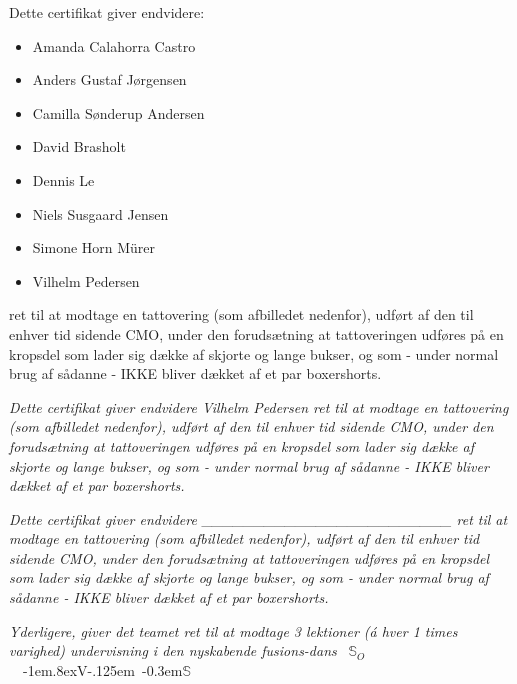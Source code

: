 \documentclass[danish]{article}
\makeatletter
\DeclareRobustCommand{\sovs}{
 \mbox{
  {\Large $\mathbb{S}_{O}$  }
  {\kern-1em\raise.8ex\hbox{V}\kern-.125em\@}
  {\kern-0.3em$\mathbb{S}$}
 }
}
\makeatother
\begin{document}
{
  \setmainfont{Ink Free} 
    {\large
         Dette certifikat giver endvidere: 
         
         \begin{itemize}
           \item Amanda Calahorra Castro
           \item Anders Gustaf Jørgensen
           \item Camilla Sønderup Andersen
           \item David Brasholt
           \item Dennis Le
           \item Niels Susgaard Jensen
           \item Simone Horn Mürer
           \item Vilhelm Pedersen
         \end{itemize}

          ret til at modtage en tattovering (som afbilledet nedenfor), udført af den til enhver tid sidende CMO, under den forudsætning at tattoveringen udføres på en kropsdel som lader sig dække af skjorte og lange bukser, og som - under normal brug af sådanne - IKKE bliver dækket af et par boxershorts.
   }
 }
 
 \vspace{2cm}

{
  \setmainfont{Ink Free} 
    {\large
       {\textit{
         Dette certifikat giver endvidere Vilhelm Pedersen ret til at modtage en tattovering (som afbilledet nedenfor), udført af den til enhver tid sidende CMO, under den forudsætning at tattoveringen udføres på en kropsdel som lader sig dække af skjorte og lange bukser, og som - under normal brug af sådanne - IKKE bliver dækket af et par boxershorts.
       }}
   }
 }
 
 \vspace{2cm}

{
  \setmainfont{Ink Free} 
    {\large
       {\textit{
         Dette certifikat giver endvidere \_\_\_\_\_\_\_\_\_\_\_\_\_\_\_\_\_\_\_\_\_\_\_\_  ret til at modtage en tattovering (som afbilledet nedenfor), udført af den til enhver tid sidende CMO, under den forudsætning at tattoveringen udføres på en kropsdel som lader sig dække af skjorte og lange bukser, og som - under normal brug af sådanne - IKKE bliver dækket af et par boxershorts.
       }}
   }
 }
\
 

 \vspace{2cm}

{
  \setmainfont{Ink Free} 
    {\large
       {\textit{ Yderligere, giver det teamet ret til at modtage 3 lektioner (á hver 1 times varighed) undervisning i den nyskabende fusions-dans } \sovs 
         
         }
   }
 }
\end{document}
